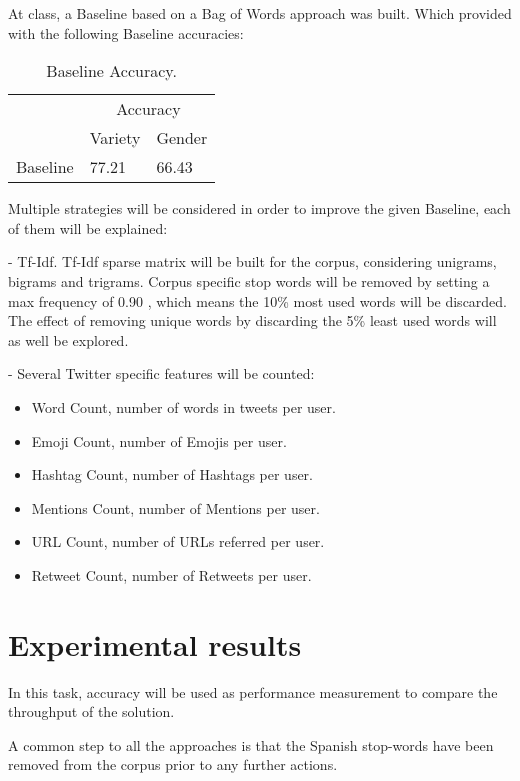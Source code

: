 \documentclass[11pt,a4paper]{article}
\begin{document}
At class, a Baseline based on a Bag of Words approach was built. Which provided with the following Baseline accuracies:

\begin{table}[htbp]
\begin{center}
\begin{tabular}{|l|l|l|}
\hline
& \multicolumn{2}{c|}{Accuracy} \\
\cline{2-3}
& Variety & Gender \\
\hline \hline
Baseline & 77.21 & 66.43 \\ \hline
\end{tabular}
\caption{Baseline Accuracy.}
\label{tabla:sencilla}
\end{center}
\end{table}

Multiple strategies will be considered in order to improve the given Baseline, each of them will be explained:

    - Tf-Idf. Tf-Idf sparse matrix will be built for the corpus, considering unigrams, bigrams and trigrams. Corpus specific stop words will be removed by setting a max frequency of 0.90 , which means the 10\% most used words will be discarded. The effect of removing unique words by discarding the 5\% least used words will as well be explored.
    
    - Several Twitter specific features will be counted:
    \begin{itemize}
    \addtolength{\itemsep}{-1mm}
    \item Word Count, number of words in tweets per user.
    \item Emoji Count, number of Emojis per user.
    \item Hashtag Count, number of Hashtags per user.
    \item Mentions Count, number of Mentions per user.
    \item URL Count, number of URLs referred per user.
    \item Retweet Count, number of Retweets per user.
    \end{itemize}

\section{Experimental results}

In this task, accuracy will be used as performance measurement to compare the throughput of the solution.

A common step to all the approaches is that the Spanish stop-words have been removed from the corpus prior to any further actions.
\end{document}
